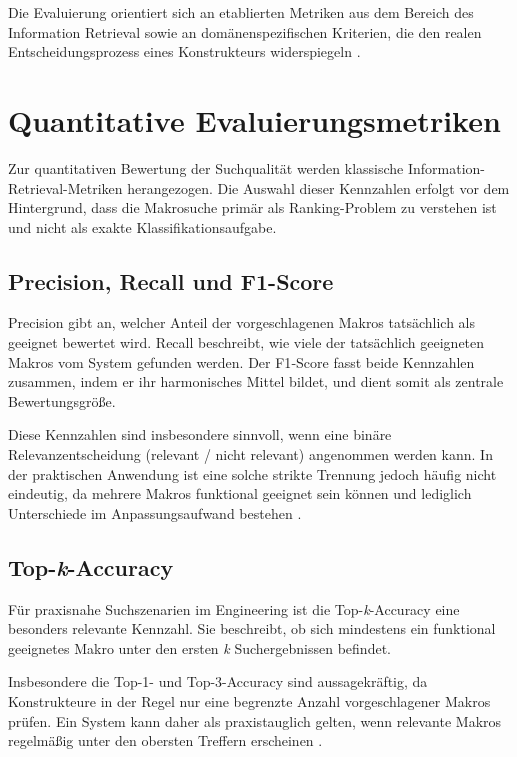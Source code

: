 Die Evaluierung orientiert sich an etablierten Metriken aus dem Bereich des Information Retrieval sowie an domänenspezifischen Kriterien, die den realen Entscheidungsprozess eines Konstrukteurs widerspiegeln \cite{lp_llm_2026}.

\section{Quantitative Evaluierungsmetriken}

Zur quantitativen Bewertung der Suchqualität werden klassische Information-Retrieval-Metriken herangezogen. Die Auswahl dieser Kennzahlen erfolgt vor dem Hintergrund, dass die Makrosuche primär als Ranking-Problem zu verstehen ist und nicht als exakte Klassifikationsaufgabe.

\subsection{Precision, Recall und F1-Score}

Precision gibt an, welcher Anteil der vorgeschlagenen Makros tatsächlich als geeignet bewertet wird. Recall beschreibt, wie viele der tatsächlich geeigneten Makros vom System gefunden werden. Der F1‑Score fasst beide Kennzahlen zusammen, indem er ihr harmonisches Mittel bildet, und dient somit als zentrale Bewertungsgröße.

Diese Kennzahlen sind insbesondere sinnvoll, wenn eine binäre Relevanzentscheidung (relevant / nicht relevant) angenommen werden kann. In der praktischen Anwendung ist eine solche strikte Trennung jedoch häufig nicht eindeutig, da mehrere Makros funktional geeignet sein können und lediglich Unterschiede im Anpassungsaufwand bestehen \cite{lp_llm_2026}.

\subsection{Top-\textit{k}-Accuracy}

Für praxisnahe Suchszenarien im Engineering ist die Top-\textit{k}-Accuracy eine besonders relevante Kennzahl. Sie beschreibt, ob sich mindestens ein funktional geeignetes Makro unter den ersten \textit{k} Suchergebnissen befindet.

Insbesondere die Top-1- und Top-3-Accuracy sind aussagekräftig, da Konstrukteure in der Regel nur eine begrenzte Anzahl vorgeschlagener Makros prüfen. Ein System kann daher als praxistauglich gelten, wenn relevante Makros regelmäßig unter den obersten Treffern erscheinen \cite{lp_llm_2026}.

